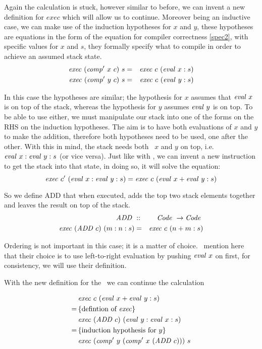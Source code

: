 \documentclass {article}
\begin{document}
Again the calculation is stuck, however similar to before, 
we can invent a new definition for $exec$ which 
will allow us to continue.
Moreover being an inductive case, 
we can make use of the induction 
hypotheses for $x$ and $y$,
these hypotheses are equations in the form
of the equation for compiler correctness \ref{spec2},
with specific values for $x$ and $s$,
they formally specify what to compile in order to achieve
an assumed stack state.
\begin{eqnarray}
\mathit{exec\ } (\mathit{comp'\ }  x\ c)\ s &=& \mathit{exec\ } c\ (\mathit{eval\ }  x:s) \label{iniduc1}\\
\mathit{exec\ } (\mathit{comp'\ }  y\ c)\ s &=& \mathit{exec\ } c\ (\mathit{eval\ }  y:s) \label{iniduc2}
\end{eqnarray}

In this case the hypotheses are similar;
the hypothesis for $x$ assumes that $\mathit{eval\ } x$
is on top of the stack,
whereas the hypothesis for $y$ assumes $\mathit{eval\ } y$
is on top.
To be able to use either, we must manipulate 
our stack into one of the forms on the RHS
on the induction hypotheses.
The aim is to have both evaluations of $x$ and $y$
to make the addition,
therefore both hypotheses need to be used,
one after the other.
With this in mind, 
the stack needs both \eval\ $x$ and $y$ on top, i.e. 
 \( \mathit{eval\ } x : \mathit{eval\ } y : s \)
(or vice versa).
Just like with \val,
we can invent a new instruction
to get the stack into that state,
in doing so, it will solve the equation:
\begin{equation*}
\mathit{exec\ }  c'\ (\mathit{eval\ } x : \mathit{eval\ } y : s) 
	= \mathit{exec\ }  c\ (\mathit{eval\ } x + \mathit{eval\ } y :s)
\end{equation*}

\newcommand{\ADDt}{\textit{ADD\ }}
\newcommand{\ADD}{\mathit{ADD\ }}

So we define ADD that
when executed, adds the top two stack elements
together and leaves the result on top of the stack.
\begin{eqnarray}
\ADD &::& \Code \rightarrow \Code \nonumber \\
\Exec (\ADD c)\ (m:n:s) &=& \Exec c\ (n+m:s)
\end{eqnarray}

Ordering is not important in this case; it is a matter of choice.
\BH\ mention here that their choice is to use
left-to-right evaluation by pushing $\mathit{eval\ } x$ on first,
for consistency, we will use their definition.

With the new definition for the 
\exec\ we can continue the calculation 

\begin{align*}
&\Exec c\ (\evalf x + \evalf y :s) \\
=\, & \{ \mbox{defintion of \exec}\} \\
&\Exec (\ADD c)\ (\evalf  y : \evalf  x : s) \\
=\, & \{ \mbox{induction hypothesis for}\  y \} \\
&\Exec (\Compp y\ (\Compp x\ (\ADD c)))\ s
\end{align*}
\end{document}
